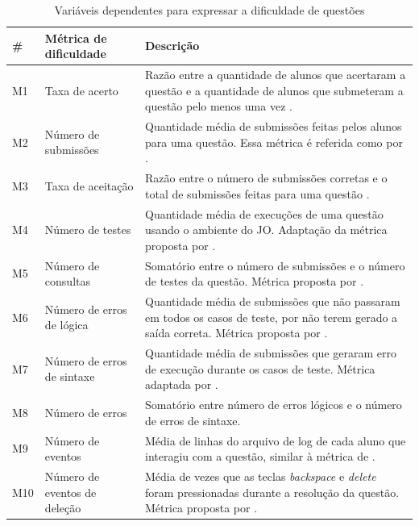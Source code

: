 \documentclass[12pt]{article}
\begin{document}
\begin{table}[!h]
    \centering
    \scriptsize
    \caption{Variáveis dependentes para expressar a dificuldade de questões}
    \label{tab:metricas_dificuldade}
    \begin{tabular}{lL{.2\textwidth}L{.7\textwidth}}
        \toprule
        \textbf{\#} &
        \textbf{Métrica de dificuldade}             & \textbf{Descrição} \\ \toprule
        M1 & Taxa de acerto               & Razão entre a quantidade de alunos que acertaram a questão e a quantidade de alunos que submeteram a questão pelo menos uma vez \cite{jackson2023}.       \\ \midrule
        M2 & Número de submissões               & Quantidade média de submissões feitas pelos alunos para uma questão. Essa métrica é referida como  por \cite{marcos2021}.       \\ \midrule
        M3 & Taxa de aceitação                   & Razão entre o número de submissões corretas e o total de submissões feitas para uma questão \cite{jackson2023}.        \\ \midrule
        M4 & Número de testes                   & Quantidade média de execuções de uma questão usando o ambiente do JO. Adaptação da métrica proposta por \cite{elrik2022}.        \\ \midrule
        M5 & Número de consultas                & Somatório entre o número de submissões e o número de testes da questão. Métrica proposta por \cite{elrik2022}.       \\ \midrule
        M6 & Número de erros de lógica                & Quantidade média de submissões que não passaram em todos os casos de teste, por não terem gerado a saída correta. Métrica proposta por \cite{jackson2023}.       \\ \midrule
        M7 & Número de erros de sintaxe                & Quantidade média de submissões que geraram erro de execução durante os casos de teste. Métrica adaptada por \cite{jackson2023}.     \\ \midrule
        M8 & Número de erros                    & Somatório entre número de erros lógicos e o número de erros de sintaxe.        \\ \midrule
        M9 & Número de eventos                  & Média de linhas do arquivo de log de cada aluno que interagiu com a questão, similar à métrica  de \cite{marcos2021}.       \\ \midrule
        M10 & Número de eventos de deleção       & Média de vezes que as teclas \textit{backspace} e \textit{delete} foram pressionadas durante a resolução da questão. Métrica proposta por \cite{marcos2021}.        \\ \midrule

\end{tabular}
\end{table}
\end{document}
